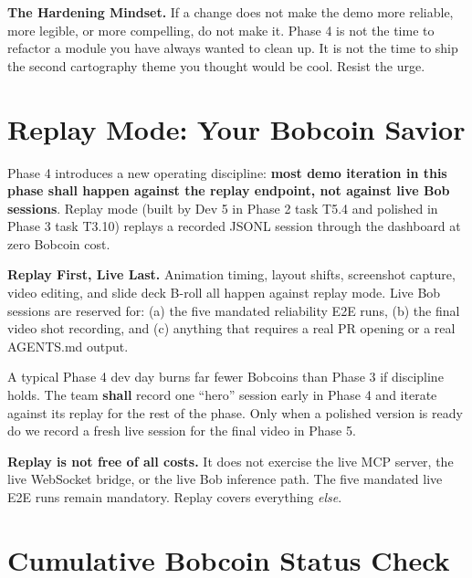 \documentclass[11pt,letterpaper]{article}
\newcommand{\shall}{\textbf{shall}}
\begin{document}
\begin{principle}
\textbf{The Hardening Mindset.} If a change does not make the demo more reliable, more legible, or more compelling, do not make it. Phase 4 is not the time to refactor a module you have always wanted to clean up. It is not the time to ship the second cartography theme you thought would be cool. Resist the urge.
\end{principle}

\section{Replay Mode: Your Bobcoin Savior}

Phase 4 introduces a new operating discipline: \textbf{most demo iteration in this phase \shall{} happen against the replay endpoint, not against live Bob sessions}. Replay mode (built by Dev 5 in Phase 2 task T5.4 and polished in Phase 3 task T3.10) replays a recorded JSONL session through the dashboard at zero Bobcoin cost.

\begin{principle}
\textbf{Replay First, Live Last.} Animation timing, layout shifts, screenshot capture, video editing, and slide deck B-roll all happen against replay mode. Live Bob sessions are reserved for: (a) the five mandated reliability E2E runs, (b) the final video shot recording, and (c) anything that requires a real PR opening or a real AGENTS.md output.
\end{principle}

A typical Phase 4 dev day burns far fewer Bobcoins than Phase 3 if discipline holds. The team \shall{} record one ``hero'' session early in Phase 4 and iterate against its replay for the rest of the phase. Only when a polished version is ready do we record a fresh live session for the final video in Phase 5.

\begin{warning}
\textbf{Replay is not free of all costs.} It does not exercise the live MCP server, the live WebSocket bridge, or the live Bob inference path. The five mandated live E2E runs remain mandatory. Replay covers everything \textit{else}.
\end{warning}

\section{Cumulative Bobcoin Status Check}
\end{document}
